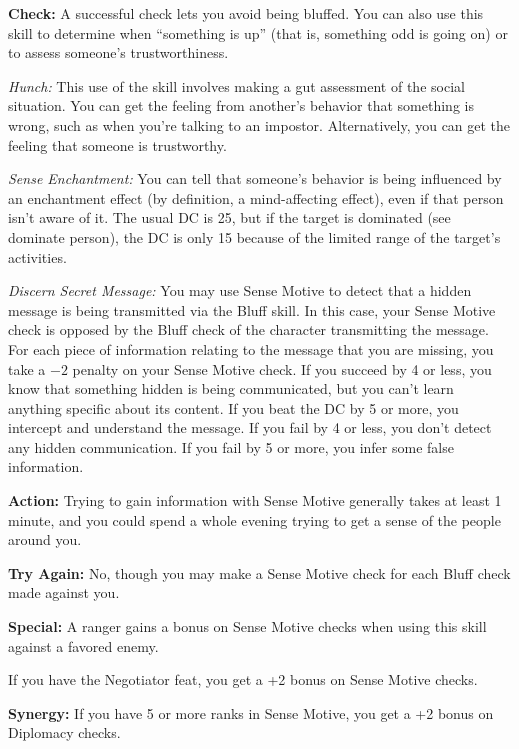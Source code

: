 \textbf{Check:} A successful check lets you avoid being bluffed. You can also use this skill to determine when ``something is up'' (that is, something odd is going on) or to assess someone's trustworthiness.


\textit{Hunch:} This use of the skill involves making a gut assessment of the social situation. You can get the feeling from another's behavior that something is wrong, such as when you're talking to an impostor. Alternatively, you can get the feeling that someone is trustworthy.

\textit{Sense Enchantment:} You can tell that someone's behavior is being influenced by an enchantment effect (by definition, a mind-affecting effect), even if that person isn't aware of it. The usual DC is 25, but if the target is dominated (see dominate person), the DC is only 15 because of the limited range of the target's activities.

\textit{Discern Secret Message:} You may use Sense Motive to detect that a hidden message is being transmitted via the Bluff skill. In this case, your Sense Motive check is opposed by the Bluff check of the character transmitting the message. For each piece of information relating to the message that you are missing, you take a $-2$ penalty on your Sense Motive check. If you succeed by 4 or less, you know that something hidden is being communicated, but you can't learn anything specific about its content. If you beat the DC by 5 or more, you intercept and understand the message. If you fail by 4 or less, you don't detect any hidden communication. If you fail by 5 or more, you infer some false information.

\textbf{Action:} Trying to gain information with Sense Motive generally takes at least 1 minute, and you could spend a whole evening trying to get a sense of the people around you.

\textbf{Try Again:} No, though you may make a Sense Motive check for each Bluff check made against you.

\textbf{Special:} A ranger gains a bonus on Sense Motive checks when using this skill against a favored enemy.

If you have the Negotiator feat, you get a +2 bonus on Sense Motive checks.

\textbf{Synergy:} If you have 5 or more ranks in Sense Motive, you get a +2 bonus on Diplomacy checks.